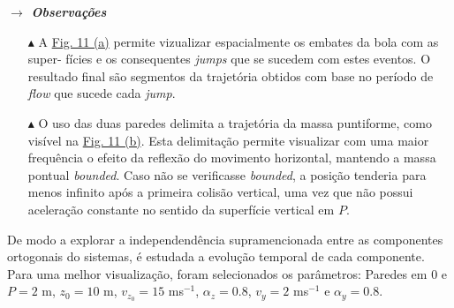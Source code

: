 \vspace{-1em}
\noindent\textbf{\textit{$\rightarrow$ Observações}}
\vspace{-0.5em}
\begin{itemize}
    \item[$\blacktriangle$] A \hyperref[fig:P4-3dPlot]{Fig. 11 (a)} permite vizualizar espacialmente os embates da bola com as super- fícies e os consequentes \textit{jumps} que se sucedem com estes eventos. O resultado final são segmentos da trajetória obtidos com base no período de \textit{flow} que sucede cada \textit{jump}.
    
    \item[$\blacktriangle$] O uso das duas paredes delimita a trajetória da massa puntiforme, como visível na \hyperref[fig:BouncingBallGif]{Fig. 11 (b)}. Esta delimitação permite visualizar com uma maior frequência o efeito da reflexão do movimento horizontal, mantendo a massa pontual \textit{bounded}. Caso não se verificasse \textit{bounded}, a posição tenderia para menos infinito após a primeira colisão vertical, uma vez que não possui aceleração constante no sentido da superfície vertical em $P$.
\end{itemize}

\noindent De modo a explorar a independendência supramencionada entre as componentes ortogonais do sistemas, é estudada a evolução temporal de cada componente. Para uma melhor visualização, foram selecionados os parâmetros: Paredes em $0$ e $P = 2$ m, $z_0 = 10$ m, $v_{z_0} = 15$ ms$^{-1}$, $\alpha_z = 0.8$, $v_y = 2$ ms$^{-1}$ e $\alpha_y = 0.8$.

